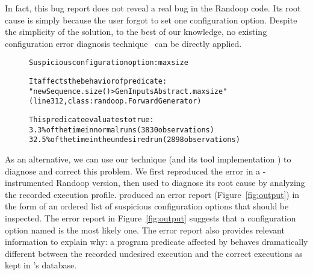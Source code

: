 
In fact, this bug report does not reveal a real bug
in the Randoop code. Its root cause is simply because
the user forgot to set one configuration option.
Despite the simplicity of the solution, to the best of our knowledge, no
existing configuration error diagnosis technique~\cite{Attariyan:2008:UCD, 
Whitaker:2004:CDS, Wang:2004:AMT,
Attariyan:2010:ACT, Rabkin:2011:PPC} can be directly applied.




\begin{figure}[t]
\begin{CodeOut}
\begin{alltt} 
Suspicious configuration option: maxsize

It affects the behavior of predicate:
"newSequence.size() > GenInputsAbstract.maxsize"
(line 312, class: randoop.ForwardGenerator) 

This predicate evaluates to true:
  3.3\% of the time in normal runs (3830 observations)
  32.5\% of the time in the undesired run (2898 observations)

\end{alltt}
\end{CodeOut}
\vspace*{-15pt}
\end{figure}

As an alternative, we can use our technique (and its tool implementation \ourtool)
to diagnose and correct this problem. We first reproduced the
error in a \ourtool-instrumented Randoop version, then used \ourtool
to diagnose its root cause by analyzing the recorded execution profile.
\ourtool produced
an error report (Figure~\ref{fig:output}) in the form of an ordered list of
suspicious configuration options that should be inspected.
The error report in Figure~\ref{fig:output} suggests that
a configuration option named
 is the most likely one.
The error report also provides relevant 
information to explain why: %
a program predicate affected by  behaves dramatically
different between the recorded undesired execution
and the correct executions as kept in \ourtool's database.


